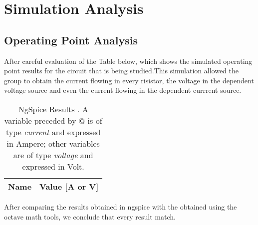 
\section{Simulation Analysis}
\label{simulation}

\subsection{Operating Point Analysis}

After careful evaluation of the Table below, which shows the simulated operating point results for the circuit that is being studied.This simulation allowed the group to obtain the current flowing in every risistor, the voltage in the dependent voltage source and even the current flowing in the dependent currrent source. 
\begin{table}[h]
  \centering
  \begin{tabular}{|l|r|}
    \hline    
    {\bf Name} & {\bf Value [A or V]} \\ \hline
    
  \end{tabular}
  \caption{NgSpice Results . A variable preceded by @ is of type {\em current}
    and expressed in Ampere; other variables are of type {\it voltage} and expressed in
    Volt.}
  \label{tab:op}
\end{table}

After comparing the results obtained in ngspice with the obtained using the octave math tools, we conclude that every result match.



